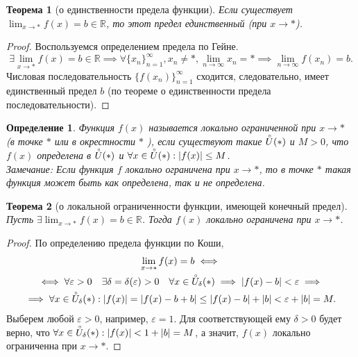 \documentclass[a4paper,12pt]{article} %
\newtheorem{definition}{Определение}[section]
\newtheorem{theorem}{Теорема}[section]
\theoremstyle{remark}
\theoremstyle{definition}
\begin{document}
\begin{theorem}[о единственности предела функции]
	Если существует $\lim_{x \to *} f(x) = b \in  \mathbb{R}$, то этот предел единственный (при $x \to *$).
\end{theorem}
\begin{proof}
	Воспользуемся определением предела по Гейне.
	\[
	\exists  \lim_{x \to *} f(x) = b \in \mathbb{R} \implies \forall \{x_n\}_{n=1}^{\infty}, x_n \neq  *, \lim_{n \to \infty} x_n = * \implies \lim_{n \to \infty} f(x_n) = b
	.\] 
	 Числовая последовательность $\{f(x_n)\}_{n=1}^{\infty}$ сходится, следовательно, имеет единственный предел $b$ (по теореме о единственности предела последовательности). 
\end{proof}

\begin{definition}
	Функция $f(x)$ называется локально ограниченной при  $x \to *$ (в точке $*$ или в окрестности $*$ ), если существуют такие $\accentset{\circ}{U}(*)$ и $M>0$, что $f(x)$ определена в  $\accentset{\circ}{U}(*) $ и $\forall x\in \accentset{\circ}{U}(*) : |f(x)| \le  M$. \\
Замечание: Если функция $f$ локально ограничена при $x \to *$, то в точке $*$ такая функция может быть как определена, так и не определена.
\end{definition}


\begin{theorem}[о локальной ограниченности функции, имеющей конечный предел]
	Пусть $\exists \lim_{x \to *} f(x) = b \in \mathbb{R}$. Тогда $f(x)$ локально ограничена при $x\to *$.
\end{theorem}
\begin{proof}
	По определению предела функции по Коши,
	\begin{multline}
	\lim_{x \to *} f(x)=b \iff \\
	\iff \forall \varepsilon> 0 \quad \exists \delta=\delta(\varepsilon)>0 \quad \forall x\in \accentset{\circ}{U}_\delta(*) \implies |f(x) - b| < \varepsilon \implies \\
	\implies \forall x\in \accentset{\circ}{U}_\delta(*) : |f(x)| = |f(x) -b + b| \le  |f(x) -b| + |b| < \varepsilon + |b| = M.
	\end{multline}
	Выберем любой $\varepsilon>0$, например, $\varepsilon=1$. Для соответствующей ему $\delta>0$ будет верно, что $\forall x\in \accentset{\circ}{U}_\delta(*) : |f(x)| < 1 + |b| = M$, а значит, $f(x)$ локально ограниченна при $x \to *$.
\end{proof}
\end{document}
